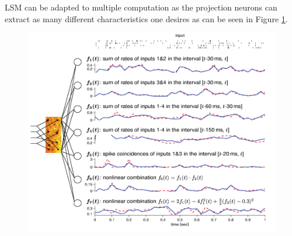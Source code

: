 \begin{frame}[allowframebreaks]
	
	
	\par LSM can be adapted to multiple computation as the projection neurons can extract as many different characteristics one desires as can be seen in Figure \ref{fig:projectionneurons}.
	
	\begin{figure}
		\centering
		\includegraphics[width=0.7\linewidth]{images/projectionNeurons}
		\caption{}
		\label{fig:projectionneurons}
	\end{figure}

	
	
	
\end{frame}
